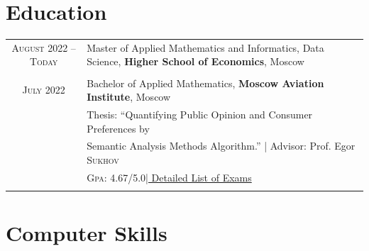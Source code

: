 \documentclass[a4paper,10pt]{article} %
\begin{document}

\section{Education}
\begin{tabular}{cp{10.5cm}}	
\textsc{August} 2022 -- \textsc{Today} & Master of Applied Mathematics and Informatics, Data Science, \textbf{Higher School of Economics}, Moscow\\
\\
\textsc{July} 2022 & Bachelor of Applied Mathematics, \textbf{Moscow Aviation Institute}, Moscow\\
& Thesis: ``Quantifying Public Opinion and Consumer Preferences by \\&Semantic Analysis Methods Algorithm.'' | \small Advisor: Prof. Egor \textsc{Sukhov}\\
&\normalsize \textsc{Gpa}: 4.67/5.0\hyperlink{grds}{\hfill | \footnotesize Detailed List of Exams}\\
&\\
\end{tabular}




\section{Computer Skills}
\end{document}
